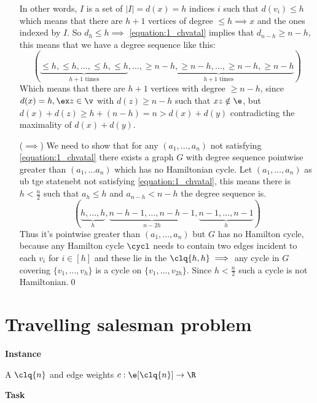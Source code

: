 \begin{prf}
\begin{itemize}
        In other words, $I$ is a set of $|I| = d(x) = h$ indices $i$ such that $d(v_i) \leq h$ which means that there are $h + 1$ vertices of degree $\leq h \implies x $ and the ones indexed by $I$. So $d_h \leq h \implies$ \ref{equation:1_chvatal} implies that $d_{n - h} \geq n - h$, this means that we have a degree sequence like this:
        \begin{equation*}
            (\underbrace{\leq h, \leq h, \dots, \leq h, \leq h}_\text{$h + 1$ times}, \dots, \underbrace{\geq n - h, \geq n - h, \dots, \geq n - h, \geq n - h}_\text{$h + 1$ times})
        \end{equation*}
        Which means that there are $h + 1$ vertices with degree $\geq n - h$, since $d(x) = h, \ex z \in \v$ with $d(z) \geq n - h$ such that $xz \notin \e$, but $d(x) + d(z) \geq h + (n - h) = n > d(x) + d(y)$ contradicting the maximality of $d(x) + d(y)$.
        \item[($\implies$)] We need to show that for any $(a_1, \dots, a_n)$ not satisfying \ref{equation:1_chvatal} there exists a graph $G$ with degree sequence pointwise greater than $(a_1, \dots a_n)$ which has no Hamiltonian cycle. Let $(a_1, \dots, a_n)$ as ub tge statenebt not satisfying \ref{equation:1_chvatal}, this means there is $h < \frac{n}{2}$ such that $a_h \leq h$ and $a_{n - h} < n - h$ the degree sequence is.
        \begin{equation*}
            (
                \underbrace{h, \dots, h}_{h},
                \underbrace{n - h - 1, \dots, n - h - 1}_{n - 2h},
                \underbrace{n - 1, \dots, n - 1}_{h}
            )
        \end{equation*}
        Thus it's pointwise greater than $(a_1, \dots, a_n)$ but $G$ has no Hamilton cycle, because any Hamilton cycle $\cycl$ needs to contain two edges incident to each $v_i$ for $i \in [h]$ and these lie in the $\clq{h,h} \implies$ any cycle in $G$ covering $\{v_1, \dots, v_h\}$ is a cycle on $\{v_1, \dots, v_{2h}\}$. Since $h < \frac{n}{2}$ such a cycle is not Hamiltonian.\qed
    \end{itemize}
\end{prf}
\section{Travelling salesman problem}
\textbf{Instance}

A $\clq{n}$ and edge weights $c: \e[\clq{n}] \rightarrow \R$

\textbf{Task}

